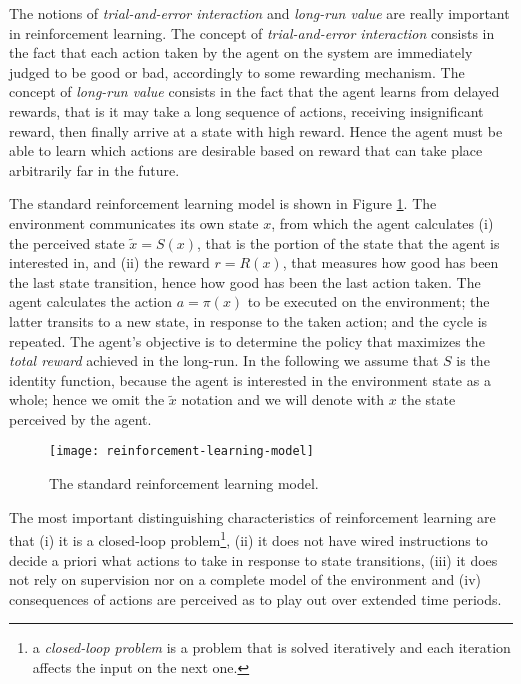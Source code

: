 The notions of \textit{trial-and-error interaction} and \textit{long-run value} are really important in reinforcement learning.
%
The concept of \textit{trial-and-error interaction} consists in the fact that each action taken by the agent on the system are immediately judged to be good or bad, accordingly to some rewarding mechanism.
%
The concept of \textit{long-run value} consists in the fact that the agent learns from delayed rewards, that is it may take a long sequence of actions, receiving insignificant reward, then finally arrive at a state with high reward.
%
Hence the agent must be able to learn which actions are desirable based on reward that can take place arbitrarily far in the future.

The standard reinforcement learning model is shown in Figure \ref{fig:reinforcement-learning-model}.
%
The environment communicates its own state $x$, from which the agent calculates 
(i) the perceived state $\tilde{x} = S(x)$, that is the portion of the state that the agent is interested in, and
(ii) the reward $r=R(x)$, that measures how good has been the last state transition, hence how good has been the last action taken.
%
The agent calculates the action $a=\pi(x)$ to be executed on the environment; the latter transits to a new state, in response to the taken action; and the cycle is repeated.
%
The agent's objective is to determine the policy that maximizes the \textit{total reward} achieved in the long-run.
%
In the following we assume that $S$ is the identity function, because the agent is interested in the environment state as a whole; hence we omit the $\tilde{x}$ notation and we will denote with $x$ the state perceived by the agent.

\begin{figure}	
	\label{fig:reinforcement-learning-model}
	\centering
	\texttt{[image: reinforcement-learning-model]}
	\caption{The standard reinforcement learning model.}
\end{figure}

The most important distinguishing characteristics of reinforcement learning are that
(i) it is a closed-loop problem\footnote{a \textit{closed-loop problem} is a problem that is solved iteratively and each iteration affects the input on the next one.},
(ii) it does not have wired instructions to decide a priori what actions to take in response to state transitions,
(iii) it does not rely on supervision nor on a complete model of the environment and
(iv) consequences of actions are perceived as to play out over extended time periods.

